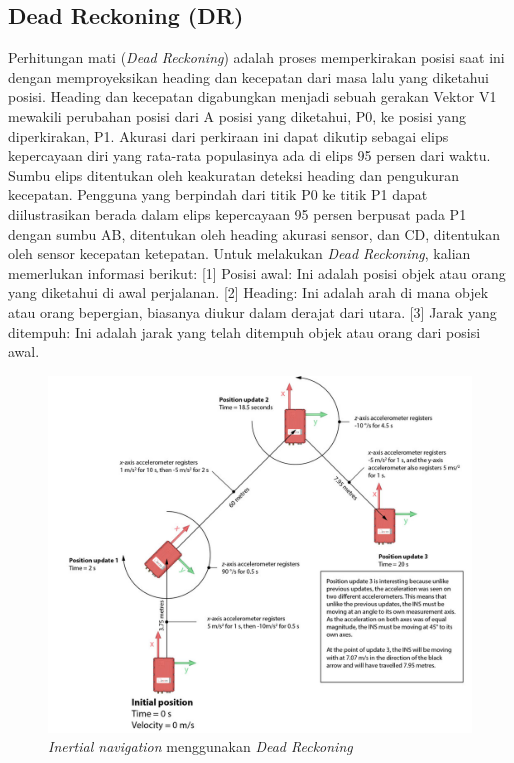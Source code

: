 \subsection{Dead Reckoning (DR)}
Perhitungan mati (\emph{Dead Reckoning}) adalah proses memperkirakan posisi saat ini dengan memproyeksikan heading dan kecepatan dari masa lalu yang diketahui posisi. 
Heading dan kecepatan digabungkan menjadi sebuah gerakan Vektor V1 mewakili perubahan posisi dari A posisi yang diketahui, P0, ke posisi yang diperkirakan, P1. 
Akurasi dari perkiraan ini dapat dikutip sebagai elips kepercayaan diri yang rata-rata populasinya ada di elips 95 persen dari waktu. Sumbu elips ditentukan oleh 
keakuratan deteksi heading dan pengukuran kecepatan. Pengguna yang berpindah dari titik P0 ke titik P1 dapat diilustrasikan berada dalam elips kepercayaan 95 persen 
berpusat pada P1 dengan sumbu AB, ditentukan oleh heading akurasi sensor, dan CD, ditentukan oleh sensor kecepatan ketepatan.
Untuk melakukan \emph{Dead Reckoning}, kalian memerlukan informasi berikut: [1] Posisi awal: Ini adalah posisi objek atau orang yang diketahui di awal perjalanan.
[2] Heading: Ini adalah arah di mana objek atau orang bepergian, biasanya diukur dalam derajat dari utara.
[3] Jarak yang ditempuh: Ini adalah jarak yang telah ditempuh objek atau orang dari posisi awal.

\begin{figure} [ht] \centering
  \includegraphics[scale=0.45]{gambar/Dead-reckoning-INS.png}
  \caption{\emph{Inertial navigation} menggunakan \emph{Dead Reckoning} \parencite{oxts2020-dr}}
  \label{fig:DR}
\end{figure}

